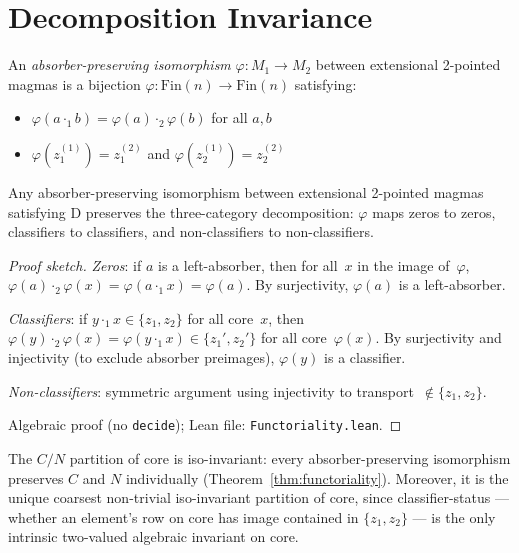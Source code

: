 \documentclass[sigconf,screen]{acmart}
\newcommand{\dotop}{\cdot}
\newcommand{\Fin}{\mathrm{Fin}}
\theoremstyle{remark}
\begin{document}
\section{Decomposition Invariance}
\label{sec:invariance}

\begin{definition}
An \emph{absorber-preserving isomorphism} $\varphi : M_1 \to M_2$ between extensional 2-pointed magmas is a bijection $\varphi : \Fin(n) \to \Fin(n)$ satisfying:
\begin{itemize}
  \item $\varphi(a \dotop_1 b) = \varphi(a) \dotop_2 \varphi(b)$ for all $a, b$
  \item $\varphi(z_1^{(1)}) = z_1^{(2)}$ and $\varphi(z_2^{(1)}) = z_2^{(2)}$
\end{itemize}
\end{definition}

\begin{theorem}[Functoriality]
\label{thm:functoriality}
Any absorber-preserving isomorphism between extensional 2-pointed magmas satisfying D preserves the three-category decomposition: $\varphi$ maps zeros to zeros, classifiers to classifiers, and non-classifiers to non-classifiers.
\end{theorem}

\begin{proof}[Proof sketch]
\emph{Zeros}: if $a$ is a left-absorber, then for all~$x$ in the image of~$\varphi$,
$\varphi(a) \dotop_2 \varphi(x) = \varphi(a \dotop_1 x) = \varphi(a)$.
By surjectivity, $\varphi(a)$ is a left-absorber.

\emph{Classifiers}: if $y \dotop_1 x \in \{z_1, z_2\}$ for all core~$x$, then
$\varphi(y) \dotop_2 \varphi(x) = \varphi(y \dotop_1 x) \in \{z_1', z_2'\}$
for all core~$\varphi(x)$.
By surjectivity and injectivity (to exclude absorber preimages), $\varphi(y)$ is a classifier.

\emph{Non-classifiers}: symmetric argument using injectivity to transport~$\notin \{z_1, z_2\}$.

Algebraic proof (no \texttt{decide}); Lean file: \texttt{Functoriality.lean}.
\end{proof}

\begin{corollary}
\label{cor:canonicity}
The $C/N$ partition of core is iso-invariant: every absorber-preserving isomorphism preserves $C$ and $N$ individually (Theorem~\ref{thm:functoriality}). Moreover, it is the unique coarsest non-trivial iso-invariant partition of core, since classifier-status --- whether an element's row on core has image contained in $\{z_1, z_2\}$ --- is the only intrinsic two-valued algebraic invariant on core.
\end{corollary}
\end{document}
